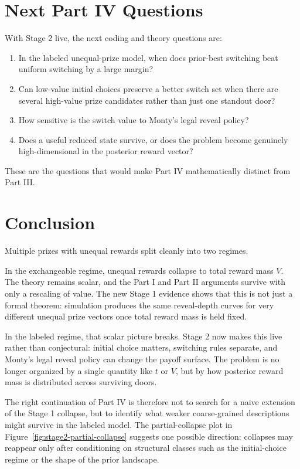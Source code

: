 \documentclass[11pt]{article}
\begin{document}
\section{Next Part IV Questions}

With Stage 2 live, the next coding and theory questions are:
\begin{enumerate}
\item In the labeled unequal-prize model, when does prior-best switching beat
uniform switching by a large margin?
\item Can low-value initial choices preserve a better switch set when there are
several high-value prize candidates rather than just one standout door?
\item How sensitive is the switch value to Monty's legal reveal policy?
\item Does a useful reduced state survive, or does the problem become genuinely
high-dimensional in the posterior reward vector?
\end{enumerate}

These are the questions that would make Part IV mathematically distinct from
Part III.

\section{Conclusion}

Multiple prizes with unequal rewards split cleanly into two regimes.

In the exchangeable regime, unequal rewards collapse to total reward mass
$V$. The theory remains scalar, and the Part I and Part II arguments survive
with only a rescaling of value. The new Stage 1 evidence shows that this is not
just a formal theorem: simulation produces the same reveal-depth curves for
very different unequal prize vectors once total reward mass is held fixed.

In the labeled regime, that scalar picture breaks. Stage 2 now makes this live
rather than conjectural: initial choice matters, switching rules separate, and
Monty's legal reveal policy can change the payoff surface. The problem is no
longer organized by a single quantity like $t$ or $V$, but by how posterior
reward mass is distributed across surviving doors.

The right continuation of Part IV is therefore not to search for a naive
extension of the Stage 1 collapse, but to identify what weaker coarse-grained
descriptions might survive in the labeled model. The partial-collapse plot in
Figure~\ref{fig:stage2-partial-collapse} suggests one possible direction:
collapses may reappear only after conditioning on structural classes such as
the initial-choice regime or the shape of the prior landscape.
\end{document}
